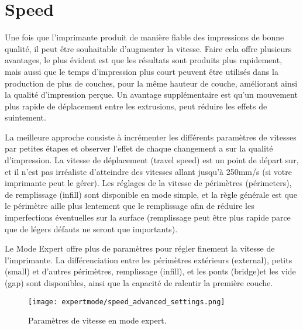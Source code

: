 
\section{Speed} %
\label{sec:speed}

Une fois que l'imprimante produit de manière fiable des impressions de bonne qualité, il peut être souhaitable d'augmenter la vitesse. Faire cela offre plusieurs avantages, le plus évident est que les résultats sont produits plus rapidement, mais aussi que le temps d'impression plus court peuvent être utilisés dans la production de plus de couches, pour la même hauteur de couche, améliorant ainsi la qualité d'impression perçue. Un avantage supplémentaire est qu'un mouvement plus rapide de déplacement entre les extrusions, peut réduire les effets de suintement.

La meilleure approche consiste à incrémenter les différents paramètres de vitesses par petites étapes et observer l'effet de chaque changement a sur la qualité d'impression. La vitesse de déplacement (travel speed) est un point de départ sur, et il n'est pas irréaliste d'atteindre des vitesses allant jusqu'à 250mm/s (si votre imprimante peut le gérer). Les réglages de la vitesse de périmètres (périmeters), de remplissage (infill) sont disponible en mode simple, et la règle générale est que le périmètre aille plus lentement que le remplissage afin de réduire les imperfections éventuelles sur la surface (remplissage peut être plus rapide parce que de légers défauts ne seront que importants).

Le Mode Expert offre plus de paramètres pour régler finement la vitesse de l'imprimante. La différenciation entre les périmètres extérieurs (external), petits (small) et d'autres périmètres, remplissage (infill), et les ponts (bridge)et les vide (gap) sont disponibles, ainsi que la capacité de ralentir la première couche.

\begin{figure}[H]
\centering
\texttt{[image: expertmode/speed\_advanced\_settings.png]}
\caption{Paramètres de vitesse en mode expert.}
\label{fig:speed_advanced_settings}
\end{figure}


